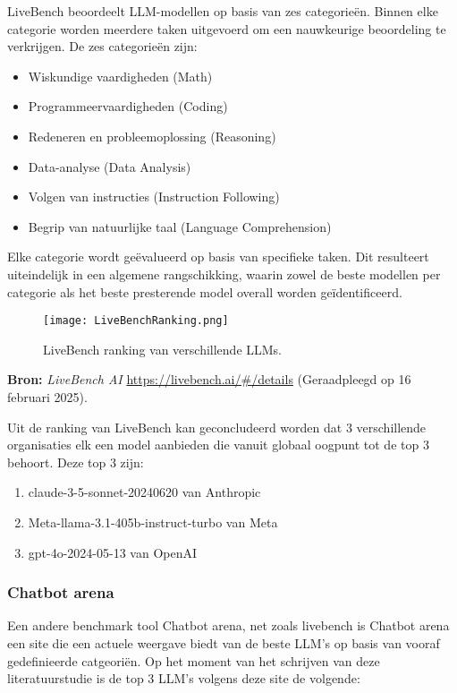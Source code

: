     LiveBench beoordeelt LLM-modellen op basis van zes categorieën. Binnen elke categorie worden meerdere taken uitgevoerd om een nauwkeurige beoordeling te verkrijgen. De zes categorieën zijn:
    \begin{itemize}
        \item Wiskundige vaardigheden (Math)
        \item Programmeervaardigheden (Coding)
        \item Redeneren en probleemoplossing (Reasoning)
        \item Data-analyse (Data Analysis)
        \item Volgen van instructies (Instruction Following)
        \item Begrip van natuurlijke taal (Language Comprehension)
    \end{itemize}
    
    Elke categorie wordt geëvalueerd op basis van specifieke taken. Dit resulteert uiteindelijk in een algemene rangschikking, waarin zowel de beste modellen per categorie als het beste presterende model overall worden geïdentificeerd.
    
    \begin{figure}[H]
        \centering
        \texttt{[image: LiveBenchRanking.png]}
        \caption{LiveBench ranking van verschillende LLMs.}
        \label{fig:livebench}
    \end{figure}
    
    \noindent\textbf{Bron:} \textit{LiveBench AI} \url{https://livebench.ai/#/details} (Geraadpleegd op 16 februari 2025).
    
    Uit de ranking van LiveBench kan geconcludeerd worden dat 3 verschillende organisaties elk een model aanbieden die vanuit globaal oogpunt tot de top 3 behoort. Deze top 3 zijn: 
    \begin{enumerate}
        \item claude-3-5-sonnet-20240620 van Anthropic
        \item Meta-llama-3.1-405b-instruct-turbo van Meta
        \item gpt-4o-2024-05-13 van OpenAI
    \end{enumerate}
    
    \subsubsection{Chatbot arena} 
    
    Een andere benchmark tool Chatbot arena, net zoals livebench is Chatbot arena een site die een actuele weergave biedt van de beste LLM's op basis van vooraf gedefinieerde catgeoriën. Op het moment van het schrijven van deze literatuurstudie is de top 3 LLM's volgens deze site de volgende:
    
